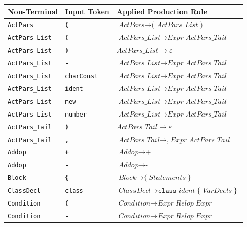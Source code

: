 \documentclass[11pt,a4paper]{article}
\newcommand{\theadcell}[1]{\textbf{\color{white}#1}}
\begin{document}
\begin{center}
\begin{tabular}{|L{3.8cm}|L{2.4cm}|L{8.2cm}|}
\hline
{}
\theadcell{Non-Terminal} & \theadcell{Input Token} & \theadcell{Applied Production Rule} \\
\hline
\texttt{ActPars} & \texttt{(} & $\textit{ActPars} \rightarrow \texttt{(}\;\textit{ActPars\_List}\;\texttt{)}$ \\
\texttt{ActPars\_List} & \texttt{(} & $\textit{ActPars\_List} \rightarrow \textit{Expr}\;\textit{ActPars\_Tail}$ \\
\texttt{ActPars\_List} & \texttt{)} & $\textit{ActPars\_List} \rightarrow \varepsilon$ \\
\texttt{ActPars\_List} & \texttt{-} & $\textit{ActPars\_List} \rightarrow \textit{Expr}\;\textit{ActPars\_Tail}$ \\
\texttt{ActPars\_List} & \texttt{charConst} & $\textit{ActPars\_List} \rightarrow \textit{Expr}\;\textit{ActPars\_Tail}$ \\
\texttt{ActPars\_List} & \texttt{ident} & $\textit{ActPars\_List} \rightarrow \textit{Expr}\;\textit{ActPars\_Tail}$ \\
\texttt{ActPars\_List} & \texttt{new} & $\textit{ActPars\_List} \rightarrow \textit{Expr}\;\textit{ActPars\_Tail}$ \\
\texttt{ActPars\_List} & \texttt{number} & $\textit{ActPars\_List} \rightarrow \textit{Expr}\;\textit{ActPars\_Tail}$ \\
\texttt{ActPars\_Tail} & \texttt{)} & $\textit{ActPars\_Tail} \rightarrow \varepsilon$ \\
\texttt{ActPars\_Tail} & \texttt{,} & $\textit{ActPars\_Tail} \rightarrow \texttt{,}\;\textit{Expr}\;\textit{ActPars\_Tail}$ \\
\texttt{Addop} & \texttt{+} & $\textit{Addop} \rightarrow \texttt{+}$ \\
\texttt{Addop} & \texttt{-} & $\textit{Addop} \rightarrow \texttt{-}$ \\
\texttt{Block} & \texttt{\{} & $\textit{Block} \rightarrow \texttt{\{}\;\textit{Statements}\;\texttt{\}}$ \\
\texttt{ClassDecl} & \texttt{class} & $\textit{ClassDecl} \rightarrow \texttt{class}\;\textit{ident}\;\texttt{\{}\;\textit{VarDecls}\;\texttt{\}}$ \\
\texttt{Condition} & \texttt{(} & $\textit{Condition} \rightarrow \textit{Expr}\;\textit{Relop}\;\textit{Expr}$ \\
\texttt{Condition} & \texttt{-} & $\textit{Condition} \rightarrow \textit{Expr}\;\textit{Relop}\;\textit{Expr}$ \\

\end{tabular}
\end{center}
\end{document}
